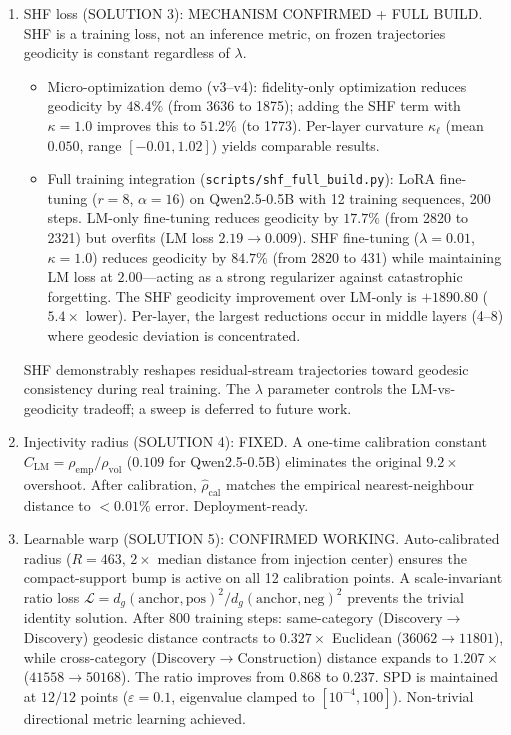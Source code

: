 \documentclass[11pt]{article}
\begin{document}
\begin{enumerate}
\item SHF loss (SOLUTION 3): MECHANISM CONFIRMED + FULL BUILD.
      SHF is a training loss, not an inference metric, on frozen
      trajectories geodicity is constant regardless of $\lambda$.
      \begin{itemize}
      \item Micro-optimization demo (v3--v4): fidelity-only
            optimization reduces geodicity by $48.4\%$ (from 3636 to 1875);
            adding the SHF term with $\kappa{=}1.0$ improves this to
            $51.2\%$ (to 1773). Per-layer curvature $\kappa_\ell$
            (mean $0.050$, range $[-0.01,1.02]$) yields comparable results.
      \item Full training integration (\texttt{scripts/shf\_full\_build.py}):
            LoRA fine-tuning ($r{=}8$, $\alpha{=}16$) on Qwen2.5-0.5B with
            12 training sequences, 200 steps. LM-only fine-tuning reduces
            geodicity by $17.7\%$ (from 2820 to 2321) but overfits
            (LM loss $2.19{\to}0.009$). SHF fine-tuning ($\lambda{=}0.01$,
            $\kappa{=}1.0$) reduces geodicity by $84.7\%$
            (from 2820 to 431) while maintaining LM loss at $2.00$---acting
            as a strong regularizer against catastrophic forgetting.
            The SHF geodicity improvement over LM-only is $+1890.80$
            ($5.4{\times}$ lower). Per-layer, the largest reductions
            occur in middle layers (4--8) where geodesic deviation is
            concentrated.
      \end{itemize}
      SHF demonstrably reshapes residual-stream trajectories toward
      geodesic consistency during real training. The $\lambda$ parameter
      controls the LM-vs-geodicity tradeoff; a sweep is deferred to
      future work.

\item Injectivity radius (SOLUTION 4): FIXED.
      A one-time calibration constant $C_{\text{LM}}{=}\rho_{\text{emp}}/\rho_{\text{vol}}$
      ($0.109$ for Qwen2.5-0.5B) eliminates the original $9.2{\times}$
      overshoot. After calibration, $\hat\rho_{\text{cal}}$ matches the
      empirical nearest-neighbour distance to $<0.01\%$ error.
      Deployment-ready.

\item Learnable warp (SOLUTION 5): CONFIRMED WORKING.
      Auto-calibrated radius ($R{=}463$, $2{\times}$ median distance
      from injection center) ensures the compact-support bump is active
      on all 12 calibration points. A scale-invariant ratio loss
      $\mathcal{L}{=}d_g(\text{anchor},\text{pos})^2/d_g(\text{anchor},\text{neg})^2$
      prevents the trivial identity solution. After 800 training steps:
      same-category (Discovery$\to$Discovery) geodesic distance contracts
      to $0.327{\times}$ Euclidean ($36062{\to}11801$), while
      cross-category (Discovery$\to$Construction) distance expands to
      $1.207{\times}$ ($41558{\to}50168$). The ratio improves from
      $0.868$ to $0.237$. SPD is maintained at $12/12$ points
      ($\varepsilon{=}0.1$, eigenvalue clamped to $[10^{-4},100]$).
      Non-trivial directional metric learning achieved.
\end{enumerate}
\end{document}

